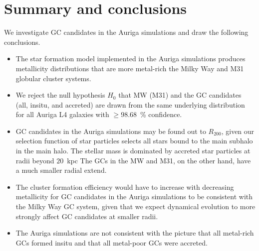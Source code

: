 \documentclass[a4paper,fleqn,usenatbib]{mnras}
\begin{document}
%
%
%



\section{Summary and conclusions}
\label{sec:conclusions}

We investigate GC candidates in the Auriga simulations and draw the following
conclusions.

\begin{itemize}
    \item The star formation model implemented in the Auriga simulations produces
    metallicity distributions that are more metal-rich the Milky Way and M31
    globular cluster systems.
    \item We reject the null hypothesis $H_0$ that MW (M31) and the GC candidates
    (all, insitu, and accreted) are drawn from the same underlying distribution
    for all Auriga L4 galaxies with $\geq 98.68$~\% confidence.
    \item GC candidates in the Auriga simulations may be found out to $R_{200}$,
    given our selection function of star particles selects all stars bound to the
    main subhalo in the main halo. The stellar mass is dominated by accreted star
    particles at radii beyond $20$~kpc The GCs in the MW and M31, on the other hand,
    have a much smaller radial extend.
    \item The cluster formation efficiency would have to increase with decreasing
    metallicity for GC candidates in the Auriga simulations to be consistent
    with the Milky Way GC system, given that we expect dynamical evolution to more strongly affect GC
    candidates at smaller radii.
    \item The Auriga simulations are not consistent with the picture that all
    metal-rich GCs formed insitu and that all metal-poor GCs were accreted.
\end{itemize}
\end{document}
